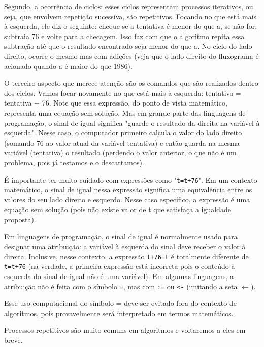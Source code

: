 Segundo, a ocorrência de ciclos: esses ciclos representam processos iterativos, ou seja, que envolvem repetição sucessiva, são repetitivos. 
 Focando no que está mais à esquerda, ele diz o seguinte: cheque se a tentativa é menor do que a, se não for, subtraia 76 e volte para a checagem. Isso faz com que o algoritmo repita essa subtração até que o resultado encontrado seja menor do que a. No ciclo do lado direito, ocorre o mesmo mas com adições (veja que o lado direito do fluxograma é acionado quando a é maior do que 1986).

O terceiro aspecto que merece atenção são os comandos que são realizados dentro dos ciclos. Vamos focar novamente no que está mais à esquerda: tentativa = tentativa + 76. Note que essa expressão, do ponto de vista matemático, representa uma equação sem solução. Mas em grande parte das linguagens de programação, o sinal de igual significa "guarde o resultado da direita na variável à esquerda". Nesse caso, o computador primeiro calcula o valor do lado direito (somando 76 ao valor atual da variável tentativa) e então guarda na mesma variável (tentativa) o resultado (perdendo o valor anterior, o que não é um problema, pois já testamos e o descartamos).

\begin{observation}{}
É importante ter muito cuidado com expressões como "\verb|t=t+76|". Em um contexto matemático, o sinal de igual nessa expressão significa uma equivalência entre os valores do seu lado direito e esquerdo. Nesse caso específico, a expressão é uma equação sem solução (pois não existe valor de t que satisfaça a igualdade proposta).

Em linguagens de programação, o sinal de igual é normalmente usado para designar uma atribuição: a variável à esquerda do sinal deve receber o valor à direita. Inclusive, nesse contexto, a expressão \verb|t+76=t| é totalmente diferente de \verb|t=t+76| (na verdade, a primeira expressão está incorreta pois o conteúdo à esquerda do sinal de igual não é uma variável). Em algumas linguagens, a atribuição não é feita com o símbolo \verb|=|, mas com \verb|:=| ou \verb|<-| (imitando a seta $\leftarrow$).

Esse uso computacional do símbolo = deve ser evitado fora do contexto de algoritmos, pois provavelmente será interpretado em termos matemáticos.
\end{observation}

Processos repetitivos são muito comuns em algoritmos e voltaremos a eles em breve.

